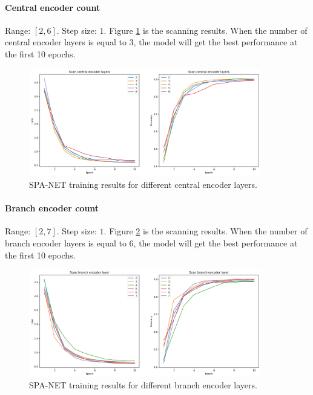 \documentclass[12pt]{article}
\begin{document}
		\paragraph{Central encoder count} Range: $[2,6]$. Step size: $1$. Figure \ref{fig:SPANet_scan_n_cen} is the scanning results. When the number of central encoder layers is equal to 3, the model will get the best performance at the first 10 epochs.
		\begin{figure}[htpb]
			\centering
			\includegraphics[width=0.9\textwidth]{accuracy_curve_hp_scan_n_cen_450GeV.png}
			\caption{SPA-NET training results for different central encoder layers.}
			\label{fig:SPANet_scan_n_cen}
		\end{figure}

		\paragraph{Branch encoder count} Range: $[2,7]$. Step size: $1$. Figure \ref{fig:SPANet_scan_n_bren} is the scanning results. When the number of branch encoder layers is equal to 6, the model will get the best performance at the first 10 epochs. 
		\begin{figure}[htpb]
			\centering
			\includegraphics[width=0.9\textwidth]{accuracy_curve_hp_scan_n_bren_450GeV.png}
			\caption{SPA-NET training results for different branch encoder layers.}
			\label{fig:SPANet_scan_n_bren}
		\end{figure}
\end{document}
